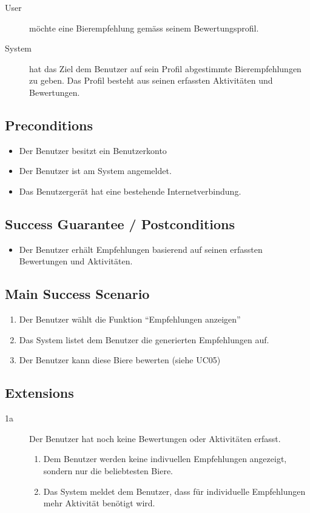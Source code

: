 \documentclass[10pt,a4paper]{scrartcl}
\begin{document}
\begin{description}
\item[User] möchte eine Bierempfehlung gemäss seinem Bewertungsprofil.
\item[System] hat das Ziel dem Benutzer auf sein Profil abgestimmte Bierempfehlungen zu geben. Das Profil besteht aus seinen erfassten Aktivitäten und Bewertungen.
\end{description}


\subsection*{Preconditions}

\begin{itemize}
\item Der Benutzer besitzt ein Benutzerkonto
\item Der Benutzer ist am System angemeldet.
\item Das Benutzergerät hat eine bestehende Internetverbindung.
\end{itemize}


\subsection*{Success Guarantee / Postconditions}
\begin{itemize}
\item Der Benutzer erhält Empfehlungen basierend auf seinen erfassten Bewertungen und Aktivitäten.
\end{itemize}


\subsection*{Main Success Scenario}

\begin{enumerate}
\item Der Benutzer wählt die Funktion ``Empfehlungen anzeigen''
\item Das System listet dem Benutzer die generierten Empfehlungen auf.
\item Der Benutzer kann diese Biere bewerten (siehe UC05)
\end{enumerate}


\subsection*{Extensions}

\begin{description}
\item[1a] Der Benutzer hat noch keine Bewertungen oder Aktivitäten erfasst.
	\begin{enumerate}
	\item Dem Benutzer werden keine indivuellen Empfehlungen angezeigt, sondern nur die beliebtesten Biere.
	\item Das System meldet dem Benutzer, dass für individuelle Empfehlungen mehr Aktivität benötigt wird.
	\end{enumerate}

\end{description}
\end{document}
